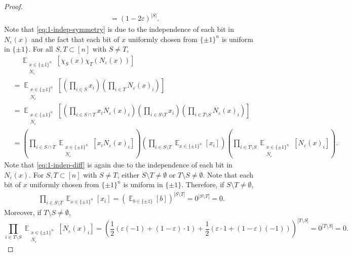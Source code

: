 \documentclass[letterpaper, reqno,11pt]{article}
\newcommand{\EE}{\mathop{{}\mathbb{E}}}
\begin{document}
\begin{enumerate}
\begin{proof}
\begin{align}
      &= (1 - 2\varepsilon)^{|S|}. \nonumber
    \end{align}
    Note that \eqref{eq:1-indep-symmetry} is due to the independence of each bit in $N_\varepsilon(x)$ and the fact that each bit of $x$ uniformly chosen from $\{ \pm 1 \}^n$ is uniform in $\{ \pm 1 \}$. For all $S, T \subset [n]$ with $S \neq T$,
    \begin{align}
      &\quad\, \EE_{\substack{x \in \{ \pm 1 \}^n \\ N_\varepsilon}}\left[\chi_S(x) \chi_T\left(N_\varepsilon(x)\right)\right] \nonumber \\
      &= \EE_{\substack{x \in \{ \pm 1 \}^n \\ N_\varepsilon}} \left[\left(\prod_{i \in S} x_i\right)\left(\prod_{i \in T} N_\varepsilon(x)_i\right)\right] \nonumber \\
      &= \EE_{\substack{x \in \{ \pm 1 \}^n \\ N_\varepsilon}} \left[\left(\prod_{i \in S \cap T} x_i N_\varepsilon(x)_i\right) \left(\prod_{i \in S \setminus T} x_i\right)\left(\prod_{i \in T \setminus S} N_\varepsilon(x)_i\right)\right] \nonumber \\
      &= \left(\prod_{i \in S \cap T} \EE_{\substack{x \in \{ \pm 1 \}^n \\ N_\varepsilon}} \left[x_i N_\varepsilon(x)_i\right]\right) \left(\prod_{i \in S \setminus T} \EE_{x \in \{ \pm 1 \}^n}\left[x_i\right]\right) \left(\prod_{i \in T \setminus S} \EE_{\substack{x \in \{ \pm 1 \}^n \\ N_\varepsilon}}\left[N_\varepsilon(x)_i\right]\right). \label{eq:1-indep-diff}
    \end{align}
    Note that \eqref{eq:1-indep-diff} is again due to the independence of each bit in $N_\varepsilon(x)$. For $S, T \subset [n]$ with $S \neq T$, either $S \setminus T \neq \emptyset$ or $T \setminus S \neq \emptyset$. Note that each bit of $x$ uniformly chosen from $\{ \pm 1 \}^n$ is uniform in $\{ \pm 1 \}$. Therefore, if $S \setminus T \neq \emptyset$,
    \begin{align*}
      \prod_{i \in S \setminus T} \EE_{x \in \{ \pm 1 \}^n}\left[x_i\right] = \left(\EE_{b \in \{ \pm 1 \}}[b]\right)^{|S \setminus T|} = 0^{|S \setminus T|} = 0.
    \end{align*}
    Moreover, if $T \setminus S \neq \emptyset$,
    $$ \prod_{i \in T \setminus S} \EE_{\substack{x \in \{ \pm 1 \}^n \\ N_\varepsilon}}\left[N_\varepsilon(x)_i\right] = \left(\frac{1}{2}(\varepsilon (-1) + (1 - \varepsilon) \cdot 1) + \frac{1}{2} (\varepsilon \cdot 1 + (1 - \varepsilon) (-1))\right)^{|T \setminus S|} = 0^{|T \setminus S|} = 0. $$

\end{proof}
\end{enumerate}
\end{document}
